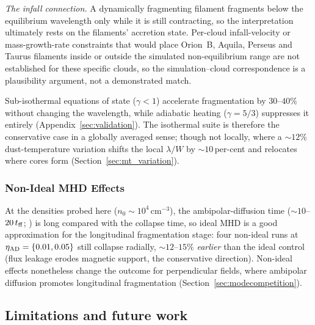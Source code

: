 \documentclass[usenatbib,twoside,twocolumn]{mnras}
\begin{document}
\emph{The infall connection.} A dynamically fragmenting filament fragments below the equilibrium wavelength only while it is still contracting, so the interpretation ultimately rests on the filaments' accretion state. Per-cloud infall-velocity or mass-growth-rate constraints that would place Orion~B, Aquila, Perseus and Taurus filaments inside or outside the simulated non-equilibrium range are not established for these specific clouds, so the simulation--cloud correspondence is a plausibility argument, not a demonstrated match.

Sub-isothermal equations of state ($\gamma<1$) accelerate fragmentation by $30$--$40\%$ without changing the wavelength, while adiabatic heating ($\gamma=5/3$) suppresses it entirely (Appendix~\ref{sec:validation}). The isothermal suite is therefore the conservative case in a globally averaged sense; though not locally, where a $\sim12\%$ dust-temperature variation shifts the local $\lambda/W$ by $\sim10$\,per-cent and relocates where cores form (Section~\ref{sec:mt_variation}).

\subsubsection{Non-Ideal MHD Effects}
\label{sec:nonideal}

At the densities probed here ($n_0\sim10^4$\,cm$^{-3}$), the ambipolar-diffusion time ($\sim10$--$20\,t_{\rm ff}$; \citealt{Tassis2004}) is long compared with the collapse time, so ideal MHD is a good approximation for the longitudinal fragmentation stage: four non-ideal runs at $\eta_{\rm AD}=\{0.01,0.05\}$ still collapse radially, $\sim12$--$15\%$ \textit{earlier} than the ideal control (flux leakage erodes magnetic support, the conservative direction). Non-ideal effects nonetheless change the outcome for perpendicular fields, where ambipolar diffusion promotes longitudinal fragmentation (Section~\ref{sec:modecompetition}).

\subsection{Limitations and future work}
\label{sec:limitations}
\end{document}
